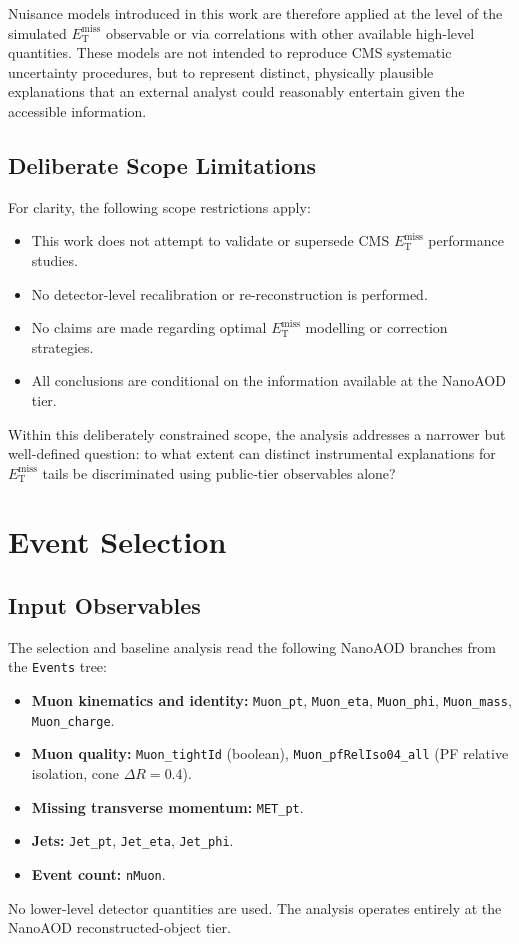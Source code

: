 \documentclass[a4paper,11pt]{article}
\newcommand{\MET}{\ensuremath{E_{\mathrm{T}}^{\mathrm{miss}}}\xspace}
\begin{document}
Nuisance models introduced in this work are therefore applied at the level
of the simulated \MET observable or via correlations with other available
high-level quantities.
These models are not intended to reproduce CMS systematic uncertainty
procedures, but to represent distinct, physically plausible explanations
that an external analyst could reasonably entertain given the accessible
information.

\subsection{Deliberate Scope Limitations}

For clarity, the following scope restrictions apply:
\begin{itemize}
  \item This work does not attempt to validate or supersede CMS \MET
    performance studies.
  \item No detector-level recalibration or re-reconstruction is performed.
  \item No claims are made regarding optimal \MET modelling or correction
    strategies.
  \item All conclusions are conditional on the information available at the
    NanoAOD tier.
\end{itemize}
Within this deliberately constrained scope, the analysis addresses a
narrower but well-defined question: to what extent can distinct instrumental
explanations for \MET tails be discriminated using public-tier observables
alone?

\section{Event Selection}
\label{sec:selection}

\subsection{Input Observables}

The selection and baseline analysis read the following NanoAOD branches from
the \texttt{Events} tree:
\begin{itemize}
  \item \textbf{Muon kinematics and identity:} \texttt{Muon\_pt},
    \texttt{Muon\_eta}, \texttt{Muon\_phi}, \texttt{Muon\_mass},
    \texttt{Muon\_charge}.
  \item \textbf{Muon quality:} \texttt{Muon\_tightId} (boolean),
    \texttt{Muon\_pfRelIso04\_all} (PF relative isolation,
    cone $\Delta R = 0.4$).
  \item \textbf{Missing transverse momentum:} \texttt{MET\_pt}.
  \item \textbf{Jets:} \texttt{Jet\_pt}, \texttt{Jet\_eta},
    \texttt{Jet\_phi}.
  \item \textbf{Event count:} \texttt{nMuon}.
\end{itemize}
No lower-level detector quantities are used.
The analysis operates entirely at the NanoAOD reconstructed-object tier.
\end{document}
